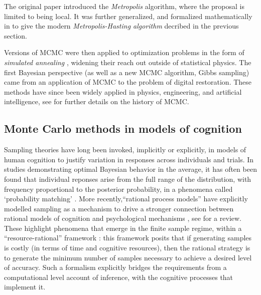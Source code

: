The original paper \citet{metropolis1953equation} introduced the \textit{Metropolis} algorithm, where the proposal is limited to being local. It was further generalized, and formalized mathematically in \citet{hastings1970monte} to give the modern \textit{Metropolis-Hasting algorithm} decribed in the previous section.

Versions of MCMC were then applied to optimization problems in the form of \textit{simulated annealing} \cite{kirkpatrick1983optimization}, widening their reach out outside of statistical physics. The first Bayesian perspective (as well as a new MCMC algorithm, Gibbs sampling) came from an application of MCMC to the problem of digital restoration\cite{geman1984stochastic}. These methods have since been widely applied in physics, engineering, and artificial intelligence, see \citet{richey2010evolution} for further details on the history of MCMC.


\subsection{Monte Carlo methods in models of cognition}

Sampling theories have long been invoked, implicitly or explicitly, in models of human cognition to justify variation in responses across individuals and trials. In studies demonstrating optimal Bayesian behavior in the average, it has often been found that individual reponses arise from the full range of the distribution, with frequency proportional to the posterior probability, in a phenomena called `probability matching' \citep{wozny2010,Denison2013,Moreno11,Vul2014}. More recently,``rational process models'' have explicitly modelled sampling as a mechanism to drive a stronger connection between rational models of cognition and psychological mechanisms \cite{griffiths2012bridging, Vul2014, shi10, sanborn2010rational, Lieder2013}, see \cite{sanborn2016bayesian} for a review. These highlight phenomena that emerge in the finite sample regime, within a ``resource-rational'' framework \citep{Vul2014,griffiths2015,Gershman2015,schulz2016simple}: this framework posits that if generating samples is costly (in terms of time and cognitive resources), then the rational strategy is to generate the minimum number of samples necessary to achieve a desired level of accuracy. Such a formalism explicitly bridges the requirements from a computational level account of inference, with the cognitive processes that implement it. 

